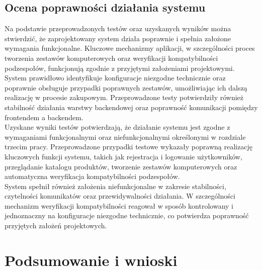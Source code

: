\documentclass[a4paper,twoside,12pt]{book}
\begin{document}
\section{Ocena poprawności działania systemu}
Na podstawie przeprowadzonych testów oraz uzyskanych wyników można stwierdzić,
że zaprojektowany system działa poprawnie i spełnia założone wymagania
funkcjonalne. Kluczowe mechanizmy aplikacji, w szczególności proces tworzenia
zestawów komputerowych oraz weryfikacji kompatybilności podzespołów, funkcjonują
zgodnie z przyjętymi założeniami projektowymi.
\vspace{0.5cm}
\\
System prawidłowo identyfikuje konfiguracje niezgodne technicznie oraz poprawnie
obsługuje przypadki poprawnych zestawów, umożliwiając ich dalszą realizację w
procesie zakupowym. Przeprowadzone testy potwierdziły również stabilność
działania warstwy backendowej oraz poprawność komunikacji pomiędzy frontendem a
backendem.
\vspace{0.5cm}
\\
Uzyskane wyniki testów potwierdzają, że działanie systemu jest zgodne z
wymaganiami funkcjonalnymi oraz niefunkcjonalnymi określonymi w rozdziale trzecim
pracy. Przeprowadzone przypadki testowe wykazały poprawną realizację kluczowych
funkcji systemu, takich jak rejestracja i logowanie użytkowników, przeglądanie
katalogu produktów, tworzenie zestawów komputerowych oraz automatyczna
weryfikacja kompatybilności podzespołów.
\vspace{0.5cm}
\\
System spełnił również założenia niefunkcjonalne w zakresie stabilności,
czytelności komunikatów oraz przewidywalności działania. W szczególności
mechanizm weryfikacji kompatybilności reagował w sposób kontrolowany i
jednoznaczny na konfiguracje niezgodne technicznie, co potwierdza poprawność
przyjętych założeń projektowych.


\chapter{Podsumowanie i wnioski}


\end{document}

